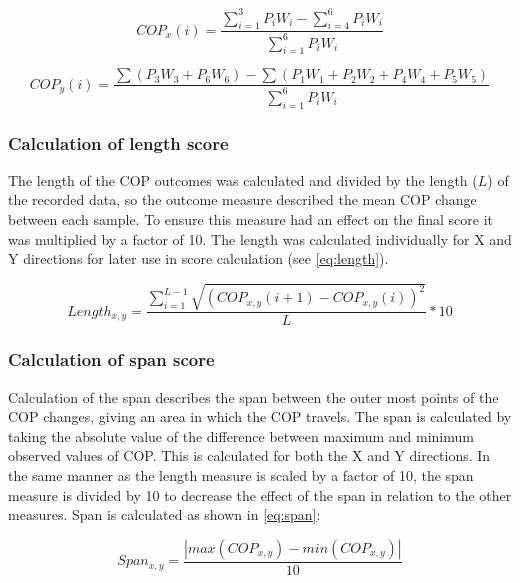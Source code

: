 \begin{equation}
COP_x(i) =  \frac{\sum_{i=1}^{3}P_i W_i - \sum_{i=4}^{6}P_i W_i}{\sum_{i=1}^{6}P_i W_i}
\end{equation} \label{eq:COPx}

\begin{equation}
COP_y(i) =  \frac{\sum(P_3 W_3 + P_6 W_6) - \sum(P_1 W_1+P_2 W_2+P_4 W_4+P_5 W_5)}{\sum_{i=1}^{6}P_i W_i}
\end{equation} \label{eq:COPy}



\subsubsection{Calculation of length score}
The length of the COP outcomes was calculated and divided by the length ($L$) of the recorded data, so the outcome measure described the mean COP change between each sample. To ensure this measure had an effect on the final score it was multiplied by a factor of 10. The length was calculated individually for X and Y directions for later use in score calculation (see \eqref{eq:length}).

\begin{equation}
	Length_{x,y} = \frac{\sum_{i=1}^{L-1}\sqrt{(COP_{x,y} (i+1)-COP_{x,y} (i))^2}}{L} * 10
\end{equation}


\subsubsection{Calculation of span score}
Calculation of the span describes the span between the outer most points of the COP changes, giving an area in which the COP travels. 
The span is calculated by taking the absolute value of the difference between maximum and minimum observed values of COP. This is calculated for both the X and Y directions. In the same manner as the length measure is scaled by a factor of 10, the span measure is divided by 10 to decrease the effect of the span in relation to the other measures. Span is calculated as shown in \eqref{eq:span}:

\begin{equation}
Span_{x,y} = \frac{\left| max(COP_{x,y})-min(COP_{x,y})\right|}{10}
\end{equation}


